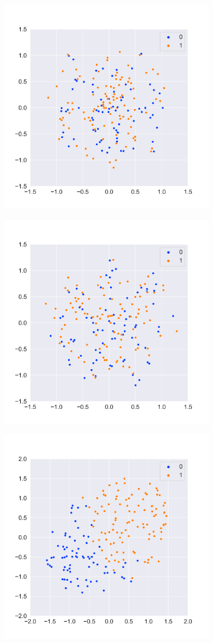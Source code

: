 \begin{figure}[htbp]
    \centering
    \begin{subfigure}
        \centering
        \includegraphics[width=0.45\linewidth]{../images/sst2_feature_map1_tsne.png}
    \end{subfigure}
    \begin{subfigure}
        \centering
        \includegraphics[width=0.45\linewidth]{../images/sst2_feature_map2_tsne.png}
    \end{subfigure}
    \begin{subfigure}
        \centering
        \includegraphics[width=0.45\linewidth]{../images/sst2_feature_map3_tsne.png}

\end{subfigure}
\end{figure}
